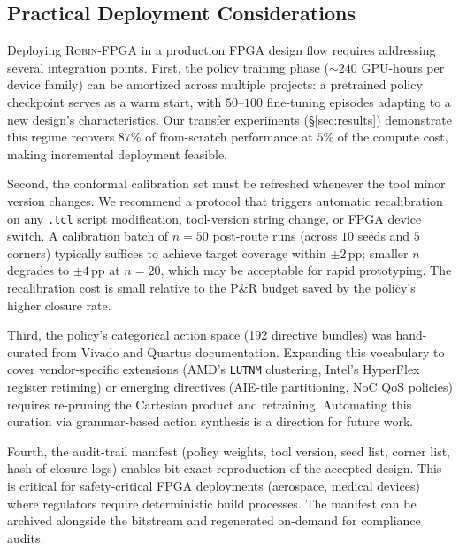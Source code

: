 \documentclass[journal,onecolumn=false]{IEEEtran}
\begin{document}

\subsection{Practical Deployment Considerations}

Deploying \textsc{Robin-FPGA} in a production FPGA design flow requires addressing several integration points. First, the policy training phase (${\sim}240$ GPU-hours per device family) can be amortized across multiple projects: a pretrained policy checkpoint serves as a warm start, with $50$--$100$ fine-tuning episodes adapting to a new design's characteristics. Our transfer experiments (\S\ref{sec:results}) demonstrate this regime recovers $87\%$ of from-scratch performance at $5\%$ of the compute cost, making incremental deployment feasible.

Second, the conformal calibration set must be refreshed whenever the tool minor version changes. We recommend a protocol that triggers automatic recalibration on any \texttt{.tcl} script modification, tool-version string change, or FPGA device switch. A calibration batch of $n=50$ post-route runs (across $10$ seeds and $5$ corners) typically suffices to achieve target coverage within $\pm 2$\,pp; smaller $n$ degrades to $\pm 4$\,pp at $n=20$, which may be acceptable for rapid prototyping. The recalibration cost is small relative to the P\&R budget saved by the policy's higher closure rate.

Third, the policy's categorical action space (192 directive bundles) was hand-curated from Vivado and Quartus documentation. Expanding this vocabulary to cover vendor-specific extensions (AMD's \texttt{LUTNM} clustering, Intel's HyperFlex register retiming) or emerging directives (AIE-tile partitioning, NoC QoS policies) requires re-pruning the Cartesian product and retraining. Automating this curation via grammar-based action synthesis is a direction for future work.

Fourth, the audit-trail manifest (policy weights, tool version, seed list, corner list, hash of closure logs) enables bit-exact reproduction of the accepted design. This is critical for safety-critical FPGA deployments (aerospace, medical devices) where regulators require deterministic build processes. The manifest can be archived alongside the bitstream and regenerated on-demand for compliance audits.
\end{document}
